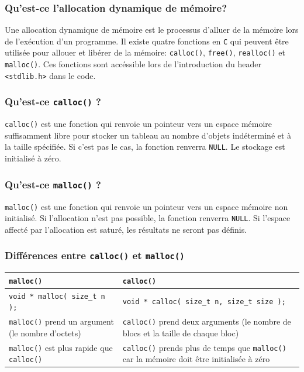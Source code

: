 \documentclass[11pt]{article}
\begin{document}
\begin{itemize}
\end{itemize}

\subsubsection{Qu'est-ce l'allocation dynamique de mémoire?}
Une allocation dynamique de mémoire est le processus d'alluer de la mémoire lors de l'exécution d'un programme. Il existe quatre fonctions en \texttt{C} qui peuvent être utilisée pour allouer et libérer de la mémoire: \texttt{calloc()}, \texttt{free()}, \texttt{realloc()} et \texttt{malloc()}. Ces fonctions sont accéssible lors de l'introduction du header \texttt{<stdlib.h>} dans le code.

\subsubsection{Qu'est-ce \texttt{calloc()} ?}
\texttt{calloc()} est une fonction qui renvoie un pointeur vers un espace mémoire suffisamment libre pour stocker un tableau au nombre d'objets indéterminé et à la taille spécifiée. Si c'est pas le cas, la fonction renverra \texttt{NULL}. Le stockage est initialisé à zéro.

\subsubsection{Qu'est-ce \texttt{malloc()} ?}
\texttt{malloc()} est une fonction qui renvoie un pointeur vers un espace mémoire non initialisé. Si l'allocation n'est pas possible, la fonction renverra \texttt{NULL}. Si l'espace affecté par l'allocation est saturé, les résultats ne seront pas définis.

\subsubsection{Différences entre \texttt{calloc()} et \texttt{malloc()}}
\begin{center}
  \begin{tabularx}{\textwidth}{| >{\centering\arraybackslash}X | >{\centering\arraybackslash}X |}
    \hline
    \textbf{\texttt{malloc()}} & \textbf{\texttt{calloc()}} \\ 
    \hline
    \texttt{void * malloc( size\_t n );} & \texttt{void * calloc( size\_t n, size\_t size );} \\
    \hline
    \texttt{malloc()} prend un argument (le nombre d'octets)  & \texttt{calloc()} prend deux arguments (le nombre de blocs et la taille de chaque bloc)  \\
    \hline
    \texttt{malloc()} est plus rapide que \texttt{calloc()} & \texttt{calloc()} prends plus de temps que \texttt{malloc()} car la mémoire doit être initialisée à zéro \\
    \hline
  \end{tabularx}
\end{center}
\end{document}

